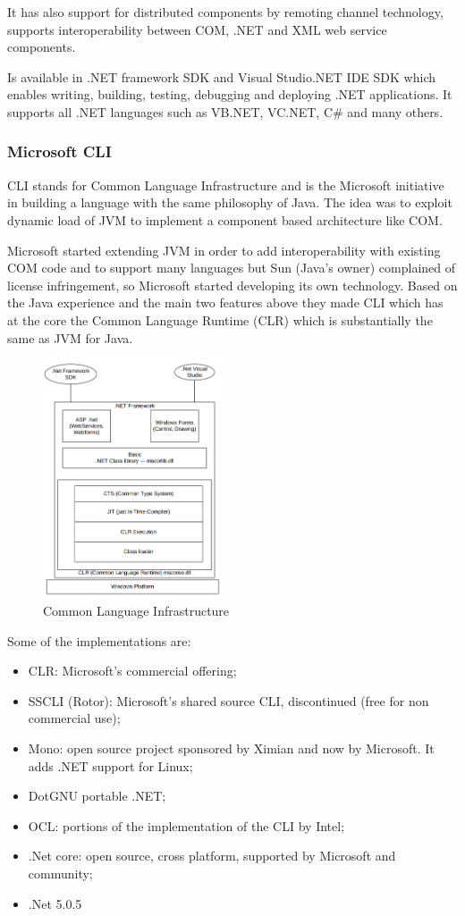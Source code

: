 It has also support for distributed components by remoting channel technology, supports interoperability between COM, .NET and XML web service components.

Is available in .NET framework SDK and Visual Studio.NET IDE SDK which enables writing, building, testing, debugging and deploying .NET applications.
It supports all .NET languages such as VB.NET, VC.NET, C\# and many others.

\subsubsection{Microsoft CLI}
CLI stands for Common Language Infrastructure and is the Microsoft initiative in building a language with the same philosophy of Java.
The idea was to exploit dynamic load of JVM to implement a component based architecture like COM.

Microsoft started extending JVM in order to add interoperability with existing COM code and to support many languages but Sun (Java's owner) complained of license infringement, so Microsoft started developing its own technology.
Based on the Java experience and the main two features above they made CLI which has at the core the Common Language Runtime (CLR) which is substantially the same as JVM for Java.
\begin{figure}[H]
    \centering
    \includegraphics[width=200px]{images/3_Software_Components/CLI_infrastructure.png}
    \caption{Common Language Infrastructure}
\end{figure}

Some of the implementations are:
\begin{itemize}
    \item CLR: Microsoft's commercial offering;
    \item SSCLI (Rotor): Microsoft's shared source CLI, discontinued (free for non commercial use);
    \item Mono: open source project sponsored by Ximian and now by Microsoft.
    It adds .NET support for Linux;
    \item DotGNU portable .NET;
    \item OCL: portions of the implementation of the CLI by Intel;
    \item .Net core: open source, cross platform, supported by Microsoft and community;
    \item .Net 5.0.5
\end{itemize}

